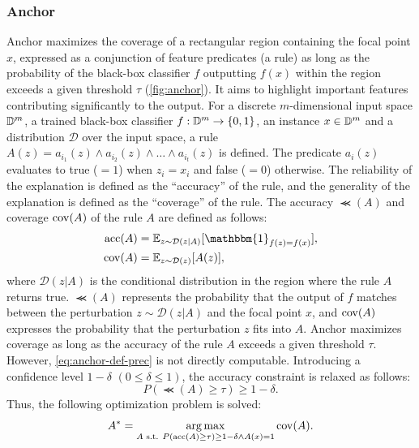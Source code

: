 \documentclass[runningheads]{llncs}
\begin{document}
\subsubsection[Anchor]{Anchor~\cite{ribeiro2018anchors}}
Anchor maximizes the coverage of a rectangular region
containing the focal point $x$,
expressed as a conjunction of feature predicates (a rule)
as long as the probability of the black-box classifier $f$
outputting $f(x)$ within the region exceeds a given threshold $\tau$
(\cref{fig:anchor}).
It aims to highlight important features
contributing significantly to the output.
For a discrete $m$-dimensional input space $\mathbb{D}^{m}$,
a trained black-box classifier $f: \mathbb{D}^{m} \to \{0,1\}$,
an instance $x \in \mathbb{D}^{m}$
and a distribution $\mathcal{D}$ over the input space,
a rule $A(z) = a_{i_1}(z) \wedge a_{i_2}(z) \wedge \dots \wedge a_{i_t}(z)$ is defined.
The predicate $a_i(z)$ evaluates to true ($=1$) when $z_i = x_i$ and false ($=0$) otherwise.
The reliability of the explanation is defined as the ``accuracy'' of the rule,
and the generality of the explanation is defined as the ``coverage'' of the rule.
The accuracy $\Prec(A)$ and coverage $\operatorname{cov}(A)$ of the rule $A$ are defined as follows:
\begin{align}
  \Prec(A) & =\mathbb{E}_{z\sim\mathcal{D}(z|A)}
  [\mathbbm{1}_{f(z)=f(x)}], \label{eq:anchor-def-prec} \\
  \Cov(A)  & =\mathbb{E}_{z\sim\mathcal{D}(z)}[A(z)],
\end{align}
where $\mathcal{D}(z|A)$ is the conditional distribution in the region
where the rule $A$ returns true.
$\Prec(A)$ represents the probability that the output of $f$ matches
between the perturbation $z\sim\mathcal{D}(z|A)$ and the focal point $x$,
and $\operatorname{cov}(A)$ expresses the probability that the perturbation $z$ fits into $A$.
Anchor maximizes coverage as long as
the accuracy of the rule $A$ exceeds a given threshold $\tau$.
However, \cref{eq:anchor-def-prec} is not directly computable.
Introducing a confidence level $1-\delta$ $(0\le\delta\le1)$,
the accuracy constraint is relaxed as follows:
\begin{equation}
  \label{eq:const-prec}
  P(\Prec(A)\ge\tau)\ge1-\delta.
\end{equation}
Thus, the following optimization problem is solved:
\begin{equation}
  \label{eq:main-problem}
  A^*=\underset{A \text{~s.t. } P(\operatorname{acc}(A)\ge\tau)\ge1-\delta\wedge A(x)=1}
  {\arg\max}\operatorname{cov}(A).
\end{equation}
\end{document}
